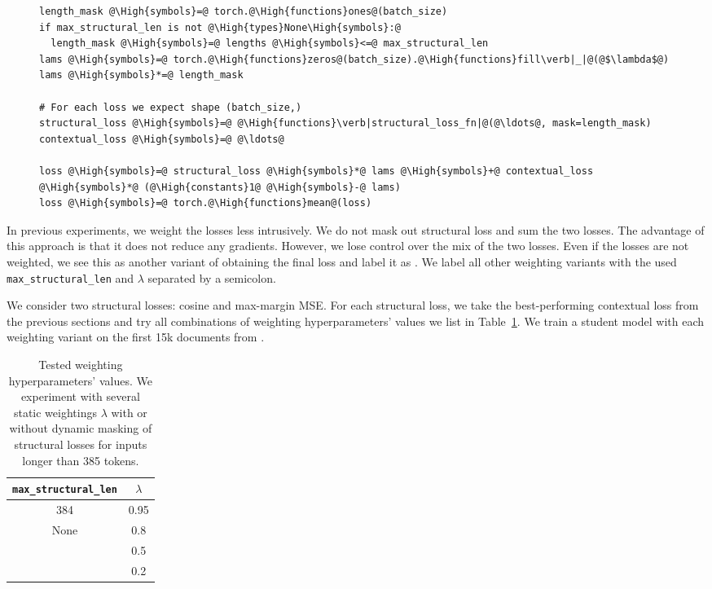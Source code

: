 \begin{figure}
\begin{lstlisting}[caption=Python-like pseudocode of weighting algorithm.,label={lst:weighting}]
length_mask @\High{symbols}=@ torch.@\High{functions}ones@(batch_size)
if max_structural_len is not @\High{types}None\High{symbols}:@
  length_mask @\High{symbols}=@ lengths @\High{symbols}<=@ max_structural_len
lams @\High{symbols}=@ torch.@\High{functions}zeros@(batch_size).@\High{functions}fill\verb|_|@(@$\lambda$@)
lams @\High{symbols}*=@ length_mask

# For each loss we expect shape (batch_size,)
structural_loss @\High{symbols}=@ @\High{functions}\verb|structural_loss_fn|@(@\ldots@, mask=length_mask)
contextual_loss @\High{symbols}=@ @\ldots@

loss @\High{symbols}=@ structural_loss @\High{symbols}*@ lams @\High{symbols}+@ contextual_loss @\High{symbols}*@ (@\High{constants}1@ @\High{symbols}-@ lams)
loss @\High{symbols}=@ torch.@\High{functions}mean@(loss)
\end{lstlisting}
\end{figure}

In previous experiments, we weight the losses less intrusively. We do not mask
out structural loss and sum the two losses. The advantage of this approach is
that it does not reduce any gradients. However, we lose control over the mix of
the two losses. Even if the losses are not weighted, we see this as another
variant of obtaining the final loss and label it as . We
label all other weighting variants with the used \texttt{max\_structural\_len}
and $\lambda$ separated by a semicolon.

We consider two structural losses: cosine and max-margin MSE. For each
structural loss, we take the best-performing contextual loss from the previous
sections and try all combinations of weighting hyperparameters' values we list
in Table~\ref{table:weighting_variants}. We train a student model with each
weighting variant on the first 15k documents from .

\begin{table}
  \centering
  \footnotesize
  \begin{tabular}{cc}
    \toprule
    \texttt{max\_structural\_len} & $\lambda$ \\
    \midrule
    384 & 0.95 \\
    None & 0.8 \\
    & 0.5 \\
    & 0.2 \\
    \bottomrule
  \end{tabular}

  \caption{Tested weighting hyperparameters' values. We experiment with several
  static weightings $\lambda$ with or without dynamic masking of structural
  losses for inputs longer than 385 tokens.}

  \label{table:weighting_variants}

\end{table}

